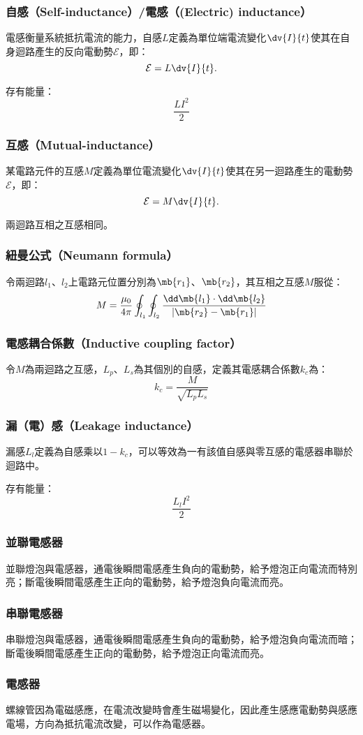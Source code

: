 \documentclass[a4paper,12pt]{report}
\begin{document}
\begin{itemize}
\subsubsection{自感（Self-inductance）/電感（(Electric) inductance）}
電感衡量系統抵抗電流的能力，自感$L$定義為單位端電流變化$\dv{I}{t}$使其在自身迴路產生的反向電動勢$\mathcal{E}$，即：
\[\mathcal{E}=L\dv{I}{t}.\]

存有能量：
\[\frac{LI^2}{2}\]
\subsubsection{互感（Mutual-inductance）}
某電路元件的互感$M$定義為單位電流變化$\dv{I}{t}$使其在另一迴路產生的電動勢$\mathcal{E}$，即：
\[\mathcal{E}=M\dv{I}{t}.\]

兩迴路互相之互感相同。
\subsubsection{紐曼公式（Neumann formula）}
令兩迴路$l_1$、$l_2$上電路元位置分別為$\mb{r_1}$、$\mb{r_2}$，其互相之互感$M$服從：
\[M=\frac{\mu_0}{4\pi}\oint_{l_1}\oint_{l_2}\frac{\dd\mb{l_1}\cdot\dd\mb{l_2}}{|\mb{r_2}-\mb{r_1}|}\]
\subsubsection{電感耦合係數（Inductive coupling factor）}
令$M$為兩迴路之互感，$L_p$、$L_s$為其個別的自感，定義其電感耦合係數$k_c$為：
\[k_c=\frac{M}{\sqrt{L_pL_s}}\]
\subsubsection{漏（電）感（Leakage inductance）}
漏感$L_l$定義為自感乘以$1-k_c$，可以等效為一有該值自感與零互感的電感器串聯於迴路中。

存有能量：
\[\frac{L_lI^2}{2}\]
\subsubsection{並聯電感器}
並聯燈泡與電感器，通電後瞬間電感產生負向的電動勢，給予燈泡正向電流而特別亮；斷電後瞬間電感產生正向的電動勢，給予燈泡負向電流而亮。
\subsubsection{串聯電感器}
串聯燈泡與電感器，通電後瞬間電感產生負向的電動勢，給予燈泡負向電流而暗；斷電後瞬間電感產生正向的電動勢，給予燈泡正向電流而亮。
\subsubsection{電感器}
螺線管因為電磁感應，在電流改變時會產生磁場變化，因此產生感應電動勢與感應電場，方向為抵抗電流改變，可以作為電感器。


\end{itemize}
\end{document}
